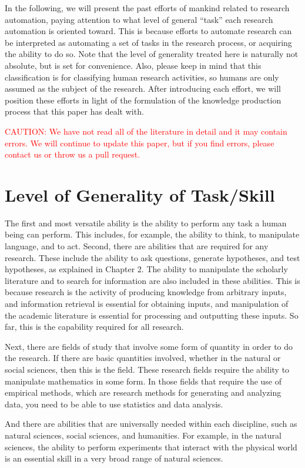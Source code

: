 In the following, we will present the past efforts of mankind related to research automation, paying attention to what level of general ``task'' each research automation is oriented toward. This is because efforts to automate research can be interpreted as automating a set of tasks in the research process, or acquiring the ability to do so. Note that the level of generality treated here is naturally not absolute, but is set for convenience. Also, please keep in mind that this classification is for classifying human research activities, so humans are only assumed as the subject of the research. After introducing each effort, we will position these efforts in light of the formulation of the knowledge production process that this paper has dealt with.

\textcolor{red}{CAUTION: We have not read all of the literature in detail and it may contain errors. We will continue to update this paper, but if you find errors, please contact us or throw us a pull request.}

\section{Level of Generality of Task/Skill}
The first and most versatile ability is the ability to perform any task a human being can perform. This includes, for example, the ability to think, to manipulate language, and to act. Second, there are abilities that are required for any research. These include the ability to ask questions, generate hypotheses, and test hypotheses, as explained in Chapter 2. The ability to manipulate the scholarly literature and to search for information are also included in these abilities. This is because research is the activity of producing knowledge from arbitrary inputs, and information retrieval is essential for obtaining inputs, and manipulation of the academic literature is essential for processing and outputting these inputs. So far, this is the capability required for all research.

Next, there are fields of study that involve some form of quantity in order to do the research. If there are basic quantities involved, whether in the natural or social sciences, then this is the field. These research fields require the ability to manipulate mathematics in some form. In those fields that require the use of empirical methods, which are research methods for generating and analyzing data, you need to be able to use statistics and data analysis.

And there are abilities that are universally needed within each discipline, such as natural sciences, social sciences, and humanities. For example, in the natural sciences, the ability to perform experiments that interact with the physical world is an essential skill in a very broad range of natural sciences.

